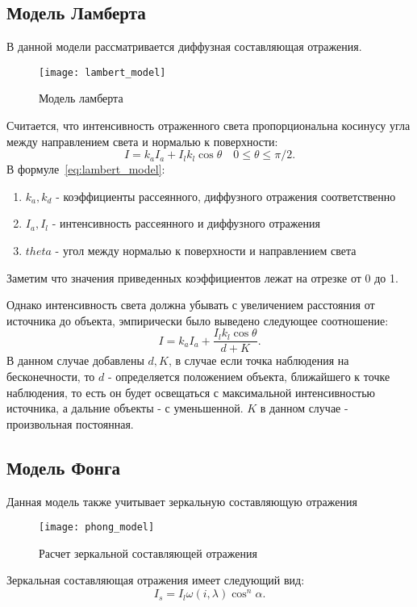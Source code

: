\subsection{Модель Ламберта}
В данной модели рассматривается диффузная составляющая отражения.

\begin{figure}[h]
	\centering
	\texttt{[image: lambert\_model]}
	\caption{Модель ламберта}
	\label{fig:lambert_model}
\end{figure}

Считается, что интенсивность отраженного света
пропорциональна косинусу угла между направлением света и нормалью к поверхности:
\begin{equation} 
	I = k_aI_a + I_lk_l\cos\theta \quad 0 \leq \theta \leq \pi/2.
	\label{eq:lambert_model}
\end{equation}
В  формуле~\ref{eq:lambert_model}:
\begin{enumerate}
	\item $k_a,k_d$ - коэффициенты рассеянного, диффузного отражения соответственно
	\item $I_a,I_l$ - интенсивность рассеянного и диффузного отражения 
	\item $theta$ - угол между нормалью к поверхности и направлением света
\end{enumerate}
Заметим что значения приведенных коэффициентов лежат на отрезке от 0 до 1.

Однако интенсивность света должна убывать с увеличением расстояния от источника до объекта, эмпирически было выведено следующее соотношение:
\begin{equation} 
	I = k_aI_a + \frac{I_lk_l\cos\theta}{d + K}.
	\label{eq:lambert_model_space}
\end{equation}
В данном случае добавлены $d,K$, в случае если точка наблюдения на бесконечности, то $d$ - определяется положением объекта,
ближайшего к точке наблюдения, то есть он будет освещаться с максимальной интенсивностью источника, а дальние объекты - с уменьшенной.
$K$ в данном случае - произвольная постоянная. \cite{Rodgers}


\subsection{Модель Фонга}
Данная модель также учитывает зеркальную составляющую отражения
\begin{figure}[h]
	\centering
	\texttt{[image: phong\_model]}
	\caption{Расчет зеркальной составляющей отражения}
	\label{fig:phong_model}
\end{figure}
\newline
Зеркальная составляющая отражения имеет следующий вид:
\begin{equation} 
	I_s = I_l\omega(i,\lambda)\cos^n \alpha.
	\label{eq:phong_model}
\end{equation}

